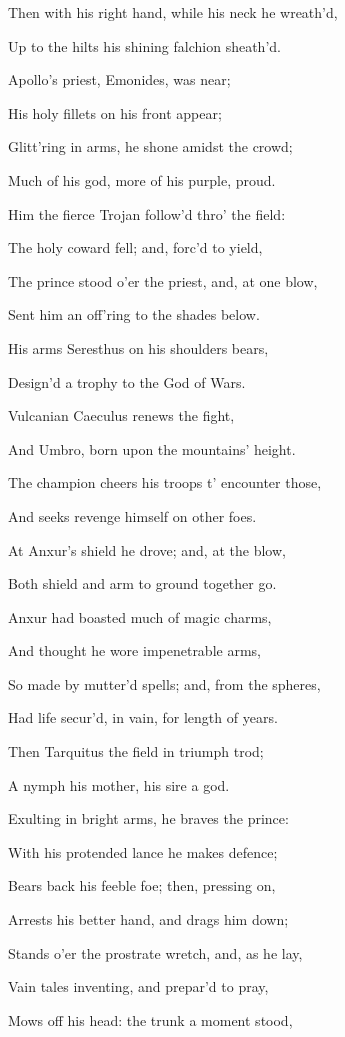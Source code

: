 Then with his right hand, while his neck he wreath’d,

Up to the hilts his shining falchion sheath’d.

Apollo’s priest, Emonides, was near;

His holy fillets on his front appear;

Glitt’ring in arms, he shone amidst the crowd;

Much of his god, more of his purple, proud.

Him the fierce Trojan follow’d thro’ the field:

The holy coward fell; and, forc’d to yield,

The prince stood o’er the priest, and, at one blow,

Sent him an off’ring to the shades below.

His arms Seresthus on his shoulders bears,

Design’d a trophy to the God of Wars.

Vulcanian Caeculus renews the fight,

And Umbro, born upon the mountains’ height.

The champion cheers his troops t’ encounter those,

And seeks revenge himself on other foes.

At Anxur’s shield he drove; and, at the blow,

Both shield and arm to ground together go.

Anxur had boasted much of magic charms,

And thought he wore impenetrable arms,

So made by mutter’d spells; and, from the spheres,

Had life secur’d, in vain, for length of years.

Then Tarquitus the field in triumph trod;

A nymph his mother, his sire a god.

Exulting in bright arms, he braves the prince:

With his protended lance he makes defence;

Bears back his feeble foe; then, pressing on,

Arrests his better hand, and drags him down;

Stands o’er the prostrate wretch, and, as he lay,

Vain tales inventing, and prepar’d to pray,

Mows off his head: the trunk a moment stood,


